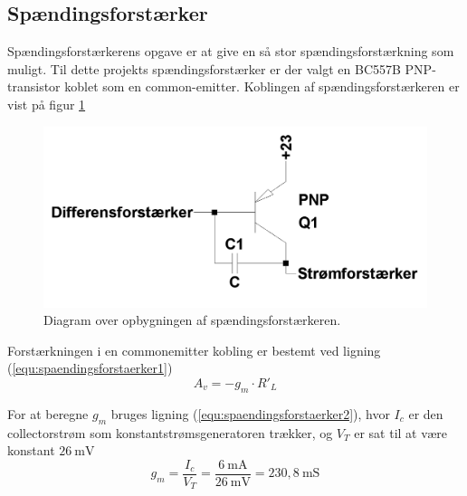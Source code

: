 \subsection{Spændingsforstærker}
\label{effekt_spaendingsforstaerker}
Spændingsforstærkerens opgave er at give en så stor spændingsforstærkning som muligt. Til dette projekts spændingsforstærker er der valgt en BC557B PNP-transistor koblet som en common-emitter. Koblingen af spændingsforstærkeren er vist på figur \ref{spaendingsforstaerker_diagram}

\begin{figure}[h]
\centering
\includegraphics[scale=0.2]{teknisk/effektforstaerker/spaendingsforstaerker_diagram.png}
\caption{Diagram over opbygningen af spændingsforstærkeren.}
\label{spaendingsforstaerker_diagram}
\end{figure}

Forstærkningen i en commonemitter kobling er bestemt ved ligning (\ref{equ:spaendingsforstaerker1}) \cite{ael-mm7}%
\begin{equation}
\label{equ:spaendingsforstaerker1}
A_v = -g_m \cdot R'_L
\end{equation}

For at beregne $g_m$ bruges ligning (\ref{equ:spaendingsforstaerker2}), hvor $I_c$ er den collectorstrøm som konstantstrømsgeneratoren trækker, og $V_T$ er sat til at være konstant $26~\mathrm{mV}$
\begin{equation}
\label{equ:spaendingsforstaerker2}
g_m = \frac{I_c}{V_T} = \frac{6~\mathrm{mA}}{26~\mathrm{mV}} = 230,8~\mathrm{mS}
\end{equation}

